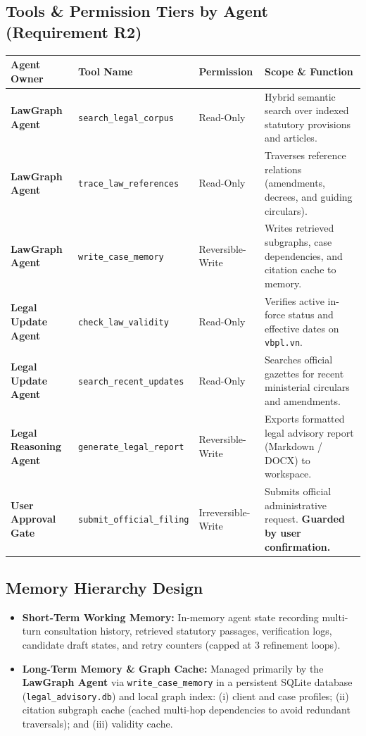 \documentclass[10pt,a4paper]{article}
\begin{document}
\subsection{Tools \& Permission Tiers by Agent (Requirement R2)}
\begin{center}
\small
\begin{tabularx}{\linewidth}{@{}l l l X@{}}
  \toprule
  \textbf{Agent Owner} & \textbf{Tool Name} & \textbf{Permission} & \textbf{Scope \& Function} \\
  \midrule
  \textbf{LawGraph Agent} & \texttt{search\_legal\_corpus} & Read-Only & Hybrid semantic search over indexed statutory provisions and articles. \\
  \textbf{LawGraph Agent} & \texttt{trace\_law\_references}& Read-Only & Traverses reference relations (amendments, decrees, and guiding circulars). \\
  \textbf{LawGraph Agent} & \texttt{write\_case\_memory}   & Reversible-Write & Writes retrieved subgraphs, case dependencies, and citation cache to memory. \\
  \textbf{Legal Update Agent}& \texttt{check\_law\_validity} & Read-Only & Verifies active in-force status and effective dates on \texttt{vbpl.vn}. \\
  \textbf{Legal Update Agent}& \texttt{search\_recent\_updates}& Read-Only & Searches official gazettes for recent ministerial circulars and amendments. \\
  \textbf{Legal Reasoning Agent}& \texttt{generate\_legal\_report}& Reversible-Write & Exports formatted legal advisory report (Markdown / DOCX) to workspace. \\
  \textbf{User Approval Gate}   & \texttt{submit\_official\_filing}& Irreversible-Write & Submits official administrative request. \textbf{Guarded by user confirmation.} \\
  \bottomrule
\end{tabularx}
\end{center}

\subsection{Memory Hierarchy Design}
\begin{itemize}[leftmargin=11pt]
  \item \textbf{Short-Term Working Memory:} In-memory agent state recording multi-turn consultation history, retrieved statutory passages, verification logs, candidate draft states, and retry counters (capped at 3 refinement loops).
  \item \textbf{Long-Term Memory \& Graph Cache:} Managed primarily by the \textbf{LawGraph Agent} via \texttt{write\_case\_memory} in a persistent SQLite database (\texttt{legal\_advisory.db}) and local graph index: (i) client and case profiles; (ii) citation subgraph cache (cached multi-hop dependencies to avoid redundant traversals); and (iii) validity cache.
\end{itemize}
\end{document}
